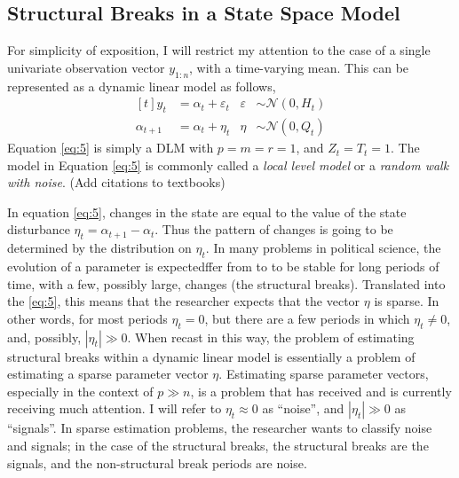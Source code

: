 \documentclass{article}
\newcommand{\paren}[1]{\ensuremath{\left(#1\right)}}
\newcommand{\dnorm}[1]{\ensuremath{\mathcal{N}\paren{#1}}}
\begin{document}
\subsection{Structural Breaks in a State Space Model}
\label{sec:struct-breaks-state}

For simplicity of exposition, I will restrict my attention to the case of a single univariate observation vector $y_{1:n}$, with a time-varying mean.
This can be represented as a dynamic linear model as follows,
\begin{equation}
  \label{eq:5}
  \begin{aligned}[t]
    y_{t} &= \alpha_{t} + \varepsilon_{t} & \varepsilon & \sim \dnorm{0, H_{t}} \\
    \alpha_{t + 1} &= \alpha_{t} + \eta_{t} & \eta & \sim \dnorm{0, Q_{t}}
  \end{aligned}
\end{equation}
Equation \eqref{eq:5} is simply a DLM with $p = m = r = 1$, and $Z_{t} = T_{t} = 1$.
The model in Equation \eqref{eq:5} is commonly called a \textit{local level model} or a \textit{random walk with noise}. (Add citations to textbooks)

In equation \eqref{eq:5}, changes in the state are equal to the value of the state disturbance $\eta_{t} = \alpha_{t+1} - \alpha_{t}$. 
Thus the pattern of changes is going to be determined by the distribution on $\eta_{t}$.
In many problems in political science, the evolution of a parameter is expectedffer from to to be stable for long periods of time, with a few, possibly large, changes (the structural breaks).
Translated into the \eqref{eq:5}, this means that the researcher expects that the vector $\eta$ is sparse. 
In other words, for most periods $\eta_{t} = 0$, but there are a few periods in which $\eta_{t} \neq 0$, and, possibly,  $|\eta_{t}| \gg 0$.
When recast in this way, the problem of estimating structural breaks within a dynamic linear model is essentially a problem of estimating a sparse parameter vector $\eta$.
Estimating sparse parameter vectors, especially in the context of $p \gg n$, is a problem that has received and is currently receiving much attention.
I will refer to $\eta_{t} \approx 0$ as ``noise'', and $|\eta_{t}| \gg 0$ as ``signals''. 
In sparse estimation problems, the researcher wants to classify noise and signals; in the case of the structural breaks, the structural breaks are the signals, and the non-structural break periods are noise.
\end{document}
